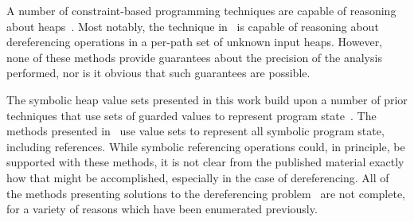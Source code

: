 A number of constraint-based programming techniques are capable of reasoning about heaps~\cite{Degrave:2010,Charreteur:2009,Albert:2013}. Most notably, the technique in~\cite{Albert:2013} is capable of reasoning about dereferencing operations in a per-path set of unknown input heaps. However, none of these methods provide guarantees about the precision of the analysis performed, nor is it obvious that such guarantees are possible.

The symbolic heap value sets presented in this work build upon a number of prior techniques that use sets of guarded values to represent program state~\cite{Sen:2014,Torlak:2014,Yorsh:2008,Xie:2005,Dillig:2011,Elkarablieh:2009}. The methods presented in~\cite{Sen:2014,Torlak:2014,Yorsh:2008} use value sets to represent all symbolic program state, including references. While symbolic referencing operations could, in principle, be supported with these methods, it is not clear from the published material exactly how that might be accomplished, especially in the case of dereferencing. All of the methods presenting solutions to the dereferencing problem~\cite{Xie:2005,Dillig:2011,Elkarablieh:2009} are not complete, for a variety of reasons which have been enumerated previously.

